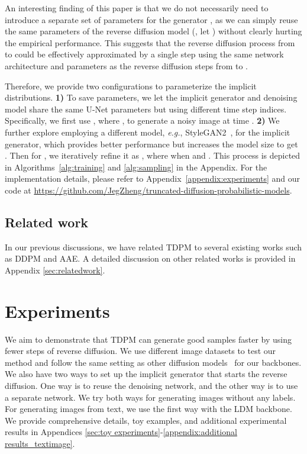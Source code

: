 \documentclass{article} \usepackage{iclr2023_conference,times}
\theoremstyle{plain}
\theoremstyle{definition}
\theoremstyle{remark}
\begin{document}
{An interesting finding of this paper is that we do not necessarily need to introduce a separate set of parameters  for the generator , as we can simply reuse the same parameters  of the reverse diffusion model (, let ) without clearly hurting the empirical performance. 
This suggests that the reverse diffusion process from  to    could  be effectively approximated by a single step using the same network architecture and parameters as the reverse diffusion steps from  to .

Therefore, we provide two configurations to parameterize the implicit distributions. \textbf{1)} To save parameters, we let the implicit generator and  denoising model share the same U-Net parameters but using different time step indices. Specifically, we
first use , where , to generate a noisy image at time . \textbf{2)} We further explore employing a different model, \textit{e.g.}, StyleGAN2~\citep{karras2020training}, for the implicit generator, which provides better performance but increases the model size to get . Then for , we iteratively refine it as , where  when  and . This process is depicted in Algorithms~\ref{alg:training} and \ref{alg:sampling} in the Appendix. For the implementation details, please refer to Appendix~\ref{appendix:experiments} and our code at \url{https://github.com/JegZheng/truncated-diffusion-probabilistic-models}.








\subsection{Related work}
In our previous discussions, we have related TDPM to several existing works such as DDPM and AAE. A detailed discussion on other related works is provided in Appendix \ref{sec:relatedwork}.

\section{Experiments}\label{sec:experiments}


We aim to demonstrate that TDPM can generate good samples faster by using fewer steps of reverse diffusion. We use different image datasets to test our method and follow the same setting as other diffusion models~\citep{ddpm,nichol2021improved,Dhariwal2021DiffusionMB,rombach2022high} for our backbones. We also have two ways to set up the implicit generator that starts the reverse diffusion. One way is to reuse the denoising network, and the other way is to use a separate network. We try both ways for generating images without any labels. For generating images from text, we use the first way with the LDM backbone. We provide comprehensive details, toy examples, and additional experimental results in Appendices \ref{sec:toy experiments}-\ref{appendix:additional results_textimage}. 






}
\end{document}
